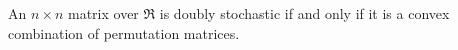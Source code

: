 \documentclass[12pt]{article}
\begin{document}
An $n \times n$ matrix over $\Re$ is doubly stochastic if and only if it is a convex combination of permutation matrices.
\end{document}

